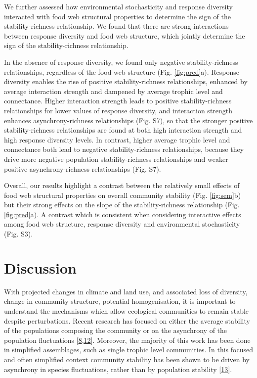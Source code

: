 \documentclass[
]{article}
\begin{document}
We further assessed how environmental stochasticity and response diversity
interacted with food web structural properties to determine the sign of the
stability-richness relationship. We found that there are strong interactions
between response diversity and food web structure, which jointly determine the
sign of the stability-richness relationship.

In the absence of response diversity, we found only negative stability-richness
relationships, regardless of the food web structure (Fig. \ref{fig:pred}a). Response
diversity enables the rise of positive stability-richness relationships,
enhanced by average interaction strength and dampened by average trophic level
and connectance. Higher interaction strength leads to positive
stability-richness relationships for lower values of response diversity, and
interaction strength enhances asynchrony-richness relationships (Fig. S7), so
that the stronger positive stability-richness relationships are found at both
high interaction strength and high response diversity levels. In contrast,
higher average trophic level and connectance both lead to negative
stability-richness relationships, because they drive more negative population
stability-richness relationships and weaker positive asynchrony-richness
relationships (Fig. S7).

Overall, our results highlight a contrast between the relatively small effects
of food web structural properties on overall community stability (Fig.
\ref{fig:sem}b) but their strong effects on the slope of the
stability-richness relationship (Fig. \ref{fig:pred}a). A contrast which is
consistent when considering interactive effects among food web structure,
response diversity and environmental stochasticity (Fig. S3).

\hypertarget{discussion}{%
\section{Discussion}\label{discussion}}

With projected changes in climate and land use, and associated loss of
diversity, change in community structure, potential homogenisation, it is
important to understand the mechanisms which allow ecological communities to
remain stable despite perturbations. Recent research has focused on either the
average stability of the populations composing the community or on the
asynchrony of the population fluctuations {[}\protect\hyperlink{ref-zhao_biodiversity_2022}{8},\protect\hyperlink{ref-thibaut_understanding_2013}{12}{]}. Moreover, the majority of
this work has been done in simplified assemblages, such as single trophic level
communities. In this focused and often simplified context community stability
has been shown to be driven by asynchrony in species fluctuations, rather than
by population stability {[}\protect\hyperlink{ref-olivier_urbanization_2020}{13}{]}.
\end{document}
